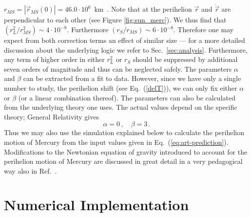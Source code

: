 \documentclass[12pt,ngerman,american]{iopart}
\newcommand{\abs}[1]{\left\vert #1 \right\vert}
\begin{document}
$ r_{MS}=\abs{\vec r_{MS}(0)} = 46.0 \cdot 10^6$~km~\cite{MercuryFactSheet}. Note that at the perihelion $\vec r$ and $\dot{\vec r}$ are perpendicular to each other (see Figure \ref{fig:sun_merc}).
We thus find that $(r_L^2/ r_{MS}^2) \sim 4\cdot10^{-8}$. Furthermore $(r_S/r_{MS})\sim6\cdot 10^{-8}$.
Therefore one may expect from both correction terms an effect of similar size --- for a more detailed discussion about the underlying logic we refer to Sec.~\ref{sec:analysis}.
Furthermore, any term of higher order in either $r_L^2$ or $r_S$
should be suppressed by additional seven orders of magnitude and thus can be neglected safely.
The parameters $\alpha$ and $\beta$ can be extracted from a fit to data.
However, since we have only a single number to study, the perihelion shift (see Eq.~(\ref{delT})),
we can only fix either $\alpha$ or $\beta$ (or a linear combination thereof).
The parameters can also be calculated from the underlying theory one uses. The actual values depend on the specific theory;
General Relativity gives~\cite{Einstein}
\begin{equation}
	\alpha = 0 \, , \quad \beta = 3 \, . \label{eq:art-prediction}
\end{equation}
Thus we may also use the simulation explained below to calculate the perihelion motion of Mercury from the input
values given in Eq.~(\ref{eq:art-prediction}).
Modifications to the Newtonian equation of gravity introduced to account for the perihelion motion of Mercury
are discussed in great detail in a very pedagogical way also in Ref.~\cite{Wells:2011st}.





\section{Numerical Implementation}\label{sec:Numerical Implementation}
\end{document}
